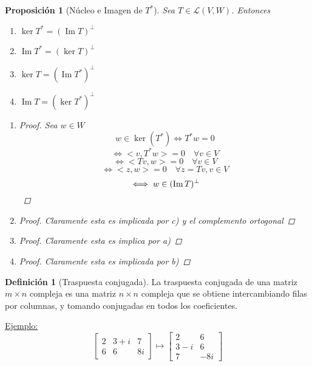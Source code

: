 \documentclass[11pt]{book}
\DeclareMathOperator{\Ima}{Im}
\newtheorem{prop}[thm]{Proposición}
\theoremstyle{definition}
\newtheorem{defn}{Definición}[section]
\begin{document}
\begin{prop}[Núcleo e Imagen de $T^*$]
	Sea $T\in\mathcal{L}(V,W)$. Entonces
	\begin{enumerate}[label=\alph*)]
		\item $\ker T^*=(\Ima T)^\perp$

		\item $\Ima T^*=(\ker T)^\perp$

		\item $\ker T=(\Ima T^*)^\perp$

		\item $\Ima T=(\ker T^*)^\perp$
	\end{enumerate}
	\begin{enumerate}[label=\alph*)]
		\item \begin{proof}
			      Sea $w\in W$
			      \[w\in\ker (T^*)\iff T^*w=0\]
			      \[\iff <v,T^*w>=0\quad\forall v\in V\]
			      \[\iff <Tv,w>=0\quad\forall v\in V\]
			      \[\iff <z,w>=0\quad\forall z=Tv,v\in V\]
			      \[\iff w\in(\Ima T)^\perp\qedhere\]
		      \end{proof}

		\item \begin{proof}
			      Claramente esta es implicada por c) y el complemento ortogonal
		      \end{proof}

		\item \begin{proof}
			      Claramente esta es implica por a)
		      \end{proof}

		\item \begin{proof}
			      Claramente esta es implicada por b)
		      \end{proof}
	\end{enumerate}
\end{prop}
\begin{defn}[Traspuesta conjugada]
	La traspuesta conjugada de una matriz $m\times n$ compleja es una matriz $n\times n$ compleja que se obtiene intercambiando filas por columnas, y tomando conjugadas en todos los coeficientes.
\end{defn}
\underline{Ejemplo:}
\[\begin{bmatrix}
		2 & 3+i & 7  \\
		6 & 6   & 8i
	\end{bmatrix}\mapsto\begin{bmatrix}
		2   & 6   \\
		3-i & 6   \\
		7   & -8i
	\end{bmatrix}\]
\end{document}

